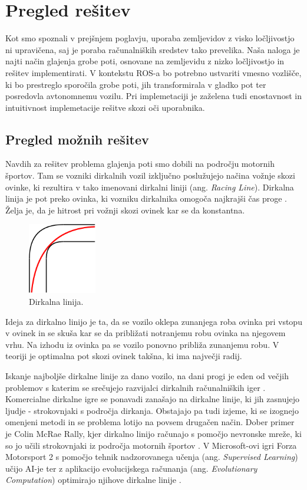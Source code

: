 \chapter{Pregled rešitev}\label{cha:metodologija}

Kot smo spoznali v prejšnjem poglavju, uporaba zemljevidov z visko ločljivostjo ni upravičena, saj je poraba računalniških sredstev tako prevelika. Naša naloga je najti način glajenja grobe poti, osnovane na zemljevidu z nizko ločljivostjo in rešitev implementirati. V kontekstu ROS-a bo potrebno ustvariti vmesno vozlišče, ki bo prestreglo sporočila grobe poti, jih transformirala v gladko pot ter posredovla avtonomnemu vozilu. Pri implemetaciji je zaželena tudi enostavnost in intuitivnost implemetacije rešitve skozi oči uporabnika.

\section{Pregled možnih rešitev}

Navdih za rešitev problema glajenja poti smo dobili na področju motornih športov. Tam se vozniki dirkalnih vozil izključno poslužujejo načina vožnje skozi ovinke, ki rezultira v tako imenovani dirkalni liniji (ang. \textit{Racing Line}). Dirkalna linija je pot preko ovinka, ki vozniku dirkalnika omogoča najkrajši čas proge \cite{vir2}. Želja je, da je hitrost pri vožnji skozi ovinek kar se da konstantna.

\begin{figure}[H]
	\centering
	\includegraphics[width=3cm]{pic/slika4.png}
	\caption{Dirkalna linija.}
	\label{fig:slika}
\end{figure}

Ideja za dirkalno linijo je ta, da se vozilo oklepa zunanjega roba ovinka pri vstopu v ovinek in se skuša kar se da približati notranjemu robu ovinka na njegovem vrhu. Na izhodu iz ovinka pa se vozilo ponovno približa zunanjemu robu. V teoriji je optimalna pot skozi ovinek takšna, ki ima največji radij.

Iskanje najboljše dirkalne linije za dano vozilo, na dani progi je eden od večjih problemov s katerim se srečujejo razvijalci dirkalnih računalniških iger \cite{vir3}. Komercialne dirkalne igre se ponavadi zanašajo na dirkalne linije, ki jih zasnujejo ljudje - strokovnjaki s področja dirkanja. Obstajajo pa tudi izjeme, ki se izognejo omenjeni metodi in se problema lotijo na povsem drugačen način. Dober primer je Colin McRae Rally, kjer dirkalno linijo računajo s pomočjo nevronske mreže, ki so jo učili strokovnjaki iz področja motornih športov \cite{vir3}. V Microsoft-ovi igri Forza Motorsport 2 s pomočjo tehnik nadzorovanega učenja (ang. \textit{Supervised Learning}) učijo AI-je ter z aplikacijo evolucijskega računanja (ang. \textit{Evolutionary Computation}) optimirajo njihove dirkalne linije \cite{vir4}.

